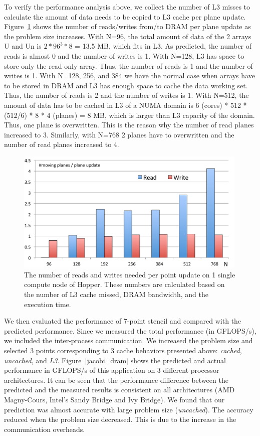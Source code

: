 \documentclass{article}
\begin{document}
To verify the performance analysis above, we collect the number of L3 misses to calculate the amount of data needs to be copied to L3 cache per plane update.
Figure~\ref{l3misses_7point} shows the number of reads/writes from/to DRAM per plane update as the problem size increases.
With N=96, the total amount of data of the 2 arrays U and Un is $2* 96^3 * 8$ = 13.5 MB, which fits in L3.
As predicted, the number of reads is almost 0 and the number of writes is 1. 
With N=128, L3 has space to store only the read only array.
Thus, the number of reads is 1 and the number of writes is 1.
With N=128, 256, and 384 we have the normal case when arrays have to be stored in DRAM and L3 has enough space to cache the data working set.
Thus, the number of reads is 2 and the number of writes is 1.
With N=512, the amount of data has to be cached in L3 of a NUMA domain is 6 (cores) * 512 * (512/6) * 8 * 4 (planes) = 8 MB, which is larger than L3 capacity of the domain.
Thus, one plane is overwritten. This is the reason why the number of read planes increased to 3.
Similarly, with N=768 2 planes have to overwritten and the number of read planes increased to 4.


\begin{figure}[htp]
\centering
\includegraphics[width=0.99\textwidth]{l3misses_7point}
\caption{The number of reads and writes needed per point update on 1 single compute node of Hopper. These numbers are calculated based on the number of L3 cache missed, DRAM bandwidth, and the execution time.}
\label{l3misses_7point}
\end{figure}


We then evaluated the performance of 7-point stencil and compared with the predicted performance.
Since we measured the total performance (in GFLOPS/s), we included the inter-process communication.
We increased the problem size and selected 3 points corresponding to 3 cache behaviors presented above: {\em cached}, {\em uncached}, and {\em L3}.
Figure~\ref{jacobi_dram} shows the predicted and actual performance in GFLOPS/s of this application on 3 different processor architectures. 
It can be seen that the performance difference between the predicted and the measured results is consistent on all architectures (AMD Magny-Cours, Intel's Sandy Bridge and Ivy Bridge).
We found that our prediction was almost accurate with large problem size ({\em uncached}).
The accuracy reduced when the problem size decreased.
This is due to the increase in the communication overheads.
\end{document}
